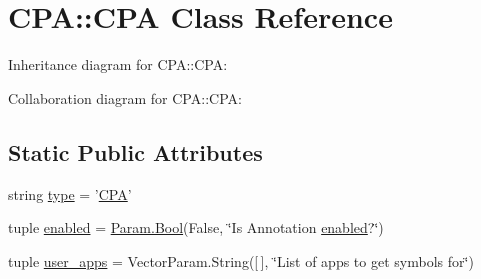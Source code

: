 \hypertarget{classCPA_1_1CPA}{
\section{CPA::CPA Class Reference}
\label{classCPA_1_1CPA}
}


Inheritance diagram for CPA::CPA:


Collaboration diagram for CPA::CPA:
\subsection*{Static Public Attributes}
\begin{DoxyCompactItemize}
\item 
string \hyperlink{classCPA_1_1CPA_acdfeaa8a4e65e395f0625cbb0003d6d9}{type} = '\hyperlink{classCPA_1_1CPA}{CPA}'
\item 
tuple \hyperlink{classCPA_1_1CPA_aa51fc369b2c6374a7e8528ebcefebad8}{enabled} = \hyperlink{sqlite3_8c_a2f520588d7cfd47c237231e103dbeb78}{Param.Bool}(False, \char`\"{}Is Annotation \hyperlink{classCPA_1_1CPA_aa51fc369b2c6374a7e8528ebcefebad8}{enabled}?\char`\"{})
\item 
tuple \hyperlink{classCPA_1_1CPA_a81ba328a54b3af6462493b928a9656f5}{user\_\-apps} = VectorParam.String(\mbox{[}$\,$\mbox{]}, \char`\"{}List of apps to get symbols for\char`\"{})
\end{DoxyCompactItemize}


